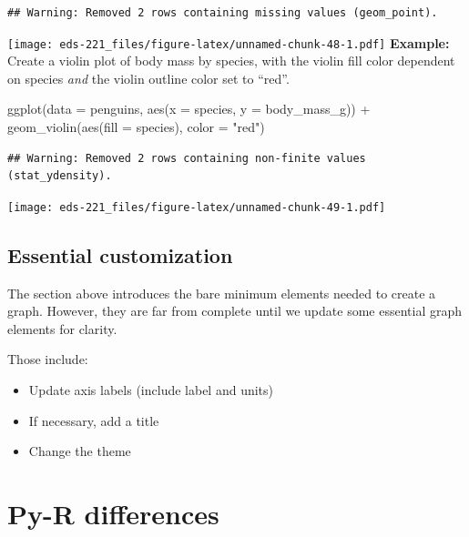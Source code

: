 \documentclass[
]{book}
\newenvironment{Shaded}{\begin{snugshade}}{\end{snugshade}}
\newcommand{\AttributeTok}[1]{\textcolor[rgb]{0.77,0.63,0.00}{#1}}
\newcommand{\FunctionTok}[1]{\textcolor[rgb]{0.00,0.00,0.00}{#1}}
\newcommand{\NormalTok}[1]{#1}
\newcommand{\SpecialCharTok}[1]{\textcolor[rgb]{0.00,0.00,0.00}{#1}}
\newcommand{\StringTok}[1]{\textcolor[rgb]{0.31,0.60,0.02}{#1}}
\providecommand{\tightlist}{%
  \setlength{\itemsep}{0pt}\setlength{\parskip}{0pt}}
\begin{document}
\begin{verbatim}
## Warning: Removed 2 rows containing missing values (geom_point).
\end{verbatim}

\texttt{[image: eds-221\_files/figure-latex/unnamed-chunk-48-1.pdf]}
\textbf{Example:} Create a violin plot of body mass by species, with the violin fill color dependent on species \emph{and} the violin outline color set to ``red''.

\begin{Shaded}
\begin{Highlighting}[]
\FunctionTok{ggplot}\NormalTok{(}\AttributeTok{data =}\NormalTok{ penguins, }\FunctionTok{aes}\NormalTok{(}\AttributeTok{x =}\NormalTok{ species, }\AttributeTok{y =}\NormalTok{ body\_mass\_g)) }\SpecialCharTok{+}
  \FunctionTok{geom\_violin}\NormalTok{(}\FunctionTok{aes}\NormalTok{(}\AttributeTok{fill =}\NormalTok{ species), }\AttributeTok{color =} \StringTok{"red"}\NormalTok{)}
\end{Highlighting}
\end{Shaded}

\begin{verbatim}
## Warning: Removed 2 rows containing non-finite values (stat_ydensity).
\end{verbatim}

\texttt{[image: eds-221\_files/figure-latex/unnamed-chunk-49-1.pdf]}

\hypertarget{essential-customization}{%
\section{Essential customization}\label{essential-customization}}

The section above introduces the bare minimum elements needed to create a graph. However, they are far from complete until we update some essential graph elements for clarity.

Those include:

\begin{itemize}
\tightlist
\item
  Update axis labels (include label and units)
\item
  If necessary, add a title
\item
  Change the theme
\end{itemize}

\hypertarget{py-r}{%
\chapter{Py-R differences}\label{py-r}}
\end{document}
